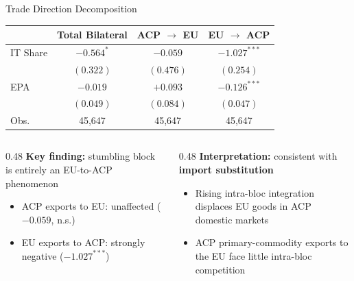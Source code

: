 \documentclass[aspectratio=169,11pt]{beamer}
\begin{document}
\begin{frame}{Trade Direction Decomposition}

    \begin{center}
    {\small
    \begin{tabular}{lccc}
        \toprule
        & Total Bilateral & ACP $\to$ EU & EU $\to$ ACP \\
        \midrule
        IT Share & $-0.564^{*}$ & $-0.059$ & \alert{$-1.027^{***}$} \\
                 & $(0.322)$    & $(0.476)$ & $(0.254)$ \\[2pt]
        EPA      & $-0.019$     & $+0.093$  & $-0.126^{***}$ \\
                 & $(0.049)$    & $(0.084)$ & $(0.047)$ \\
        \midrule
        Obs.     & 45,647       & 45,647    & 45,647 \\
        \bottomrule
    \end{tabular}}
    \end{center}

    \medskip

    \begin{columns}[T]
        \begin{column}{0.48\textwidth}
            \textbf{Key finding:} stumbling block is entirely an \alert{EU-to-ACP} phenomenon
            \begin{itemize}
                \item ACP exports to EU: unaffected ($-0.059$, n.s.)
                \item EU exports to ACP: strongly negative ($-1.027^{***}$)
            \end{itemize}
        \end{column}
        \begin{column}{0.48\textwidth}
            \textbf{Interpretation:} consistent with \textbf{import substitution}
            \begin{itemize}
                \item Rising intra-bloc integration displaces EU goods in ACP domestic markets
                \item ACP primary-commodity exports to the EU face little intra-bloc competition
            \end{itemize}
        \end{column}
    \end{columns}

\end{frame}
\end{document}
